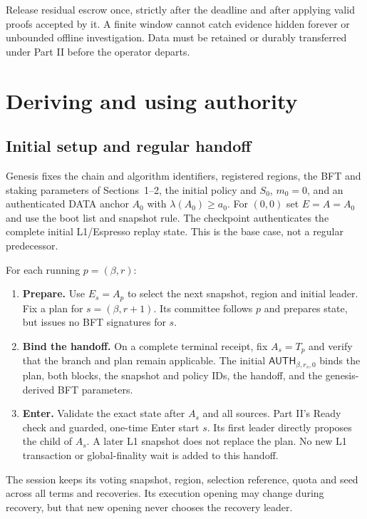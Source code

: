 \documentclass[11pt,a4paper]{article}
\newcommand{\tagg}[1]{\mathsf{#1}}
\begin{document}
Release residual escrow once, strictly after the deadline and after
applying valid proofs accepted by it. A finite window cannot catch evidence
hidden forever or unbounded offline investigation. Data must be retained
or durably transferred under Part II before the operator departs.

\newpage
\section{Deriving and using authority}
\label{sec:authority}
\subsection{Initial setup and regular handoff}
Genesis fixes the chain and algorithm identifiers, registered regions,
the BFT and staking parameters of Sections~1--2, the initial policy and
$S_0$, $m_0=0$, and an authenticated DATA anchor $A_0$ with
$\lambda(A_0)\ge a_0$. For $(0,0)$ set $E=A=A_0$ and use the boot list
and snapshot rule. The checkpoint authenticates the complete initial
L1/Espresso replay state. This is the base case, not a regular predecessor.

For each running $p=(\beta,r)$:
\begin{enumerate}[label=\textbf{\arabic*.},itemsep=4pt]
\item \textbf{Prepare.} Use $E_s=A_p$ to select the next snapshot, region
and initial leader. Fix a plan for $s=(\beta,r+1)$. Its committee follows
$p$ and prepares state, but issues no BFT signatures for $s$.
\item \textbf{Bind the handoff.} On a complete terminal receipt, fix
$A_s=T_p$ and verify that the branch and plan remain applicable. The initial
$\tagg{AUTH}_{\beta,r_s,0}$ binds the plan, both blocks, the snapshot and
policy IDs, the handoff, and the genesis-derived BFT parameters.
\item \textbf{Enter.} Validate the exact state after $A_s$ and all sources.
Part II's Ready check and guarded, one-time Enter start $s$. Its first
leader directly proposes the child of $A_s$. A later L1 snapshot does
not replace the plan. No new L1 transaction or global-finality wait is
added to this handoff.
\end{enumerate}

The session keeps its voting snapshot, region, selection reference, quota
and seed across all terms and recoveries. Its execution opening may change
during recovery, but that new opening never chooses the recovery leader.
\end{document}

